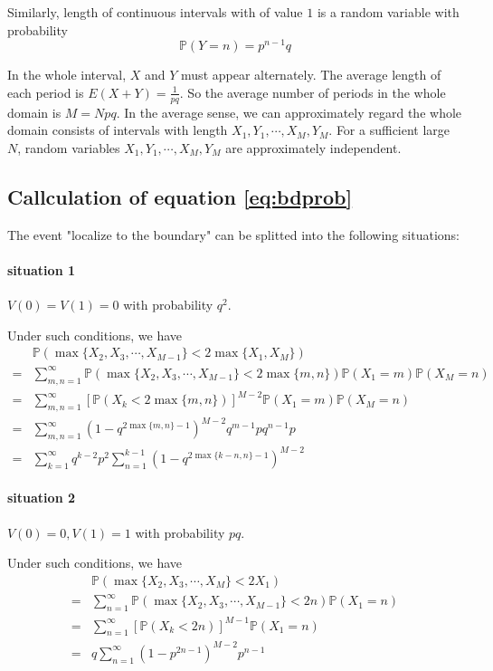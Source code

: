 \documentclass[12pt,a4paper]{article}
\begin{document}
\begin{appendices}
Similarly, length of continuous intervals with of value $1$ is a random variable with probability
$$ \mathbb{P}(Y = n) = p^{n-1} q $$

In the whole interval, $X$ and $Y$ must appear alternately. The average length of each period is $E(X+Y) = \frac{1}{p q}$. So the average number of periods in the whole domain is $M = N p q$. In the average sense, we can approximately regard the whole domain consists of intervals with length $X_1, Y_1, \cdots, X_M, Y_M$. For a sufficient large $N$, random variables $X_1, Y_1, \cdots, X_M, Y_M$ are approximately independent.

\subsection{Callculation of equation \ref{eq:bdprob}}

The event "localize to the boundary" can be splitted into the following situations:

\paragraph*{situation 1}
$V(0) = V(1) = 0$ with probability $q^2$.

Under such conditions, we have
\begin{align*}
  & \mathbb{P}(\max\{X_2, X_3, \cdots, X_{M-1}\} < 2 \max\{X_1, X_M\}) \\
= & \sum_{m,n=1}^{\infty} \mathbb{P}(\max\{X_2, X_3, \cdots, X_{M-1}\} < 2 \max\{m,  n\}) \mathbb{P}(X_1 = m) \mathbb{P}(X_M = n) \\
= & \sum_{m,n=1}^{\infty} [\mathbb{P}(X_k < 2 \max\{m,n\}) ]^{M-2} \mathbb{P}(X_1 = m) \mathbb{P}(X_M = n)\\
= & \sum_{m,n=1}^{\infty} (1 - q^{2 \max\{m,n\}-1})^{M-2} q^{m-1} p q^{n-1} p\\
= & \sum_{k=1}^{\infty} q^{k-2} p^2 \sum_{n=1}^{k-1} (1 - q^{2 \max\{k-n,n\}-1})^{M-2} 
\end{align*}

\paragraph*{situation 2}
$V(0) = 0, V(1) = 1$ with probability $p q$.

Under such conditions, we have
\begin{align*}
  & \mathbb{P}(\max\{X_2, X_3, \cdots, X_{M}\} < 2 X_1) \\
= & \sum_{n=1}^{\infty} \mathbb{P}(\max\{X_2, X_3, \cdots, X_{M-1}\} < 2 n) \mathbb{P}(X_1 = n) \\
= & \sum_{n=1}^{\infty} [\mathbb{P}(X_k < 2 n)]^{M-1} \mathbb{P}(X_1 = n)\\
= & q \sum_{n=1}^{\infty} (1 - p^{2 n-1})^{M-2} p^{n-1}
\end{align*}


\end{appendices}
\end{document}
